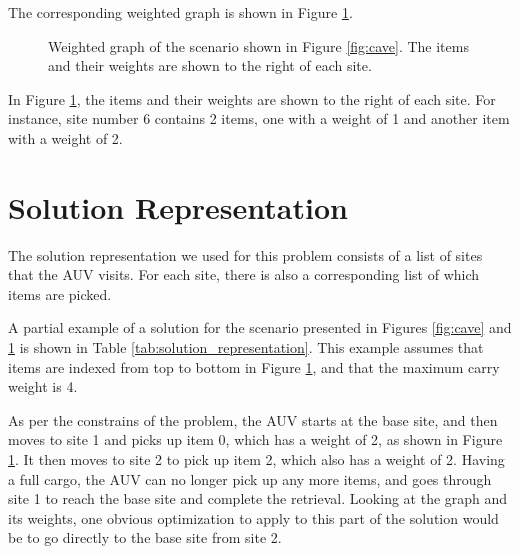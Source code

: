\documentclass[conference]{IEEEtran}
\begin{document}
The corresponding weighted graph is shown in Figure \ref{fig:graph}.

\begin{figure}[H]
  	  \centering
  	  
      \caption{Weighted graph of the scenario shown in Figure \ref{fig:cave}. The items and their weights are shown to the right of each site.}
      \label{fig:graph}
\end{figure}

In Figure \ref{fig:graph}, the items and their weights are shown to the right of each site. For instance, site number 6 contains 2 items, one with a weight of 1 and another item with a weight of 2.

\section{Solution Representation}

The solution representation we used for this problem consists of a list of sites that the AUV visits. For each site, there is also a corresponding list of which items are picked.

A partial example of a solution for the scenario presented in Figures \ref{fig:cave} and \ref{fig:graph} is shown in Table \ref{tab:solution_representation}. This example assumes that items are indexed from top to bottom in Figure \ref{fig:graph}, and that the maximum carry weight is 4.

\begin{table}[ht]
\caption{Example of a solution}
\label{tab:solution_representation}
\end{table}

As per the constrains of the problem, the AUV starts at the base site, and then moves to site 1 and picks up item 0, which has a weight of 2, as shown in Figure \ref{fig:graph}. It then moves to site 2 to pick up item 2, which also has a weight of 2. Having a full cargo, the AUV can no longer pick up any more items, and goes through site 1 to reach the base site and complete the retrieval. Looking at the graph and its weights, one obvious optimization to apply to this part of the solution would be to go directly to the base site from site 2.
\end{document}
